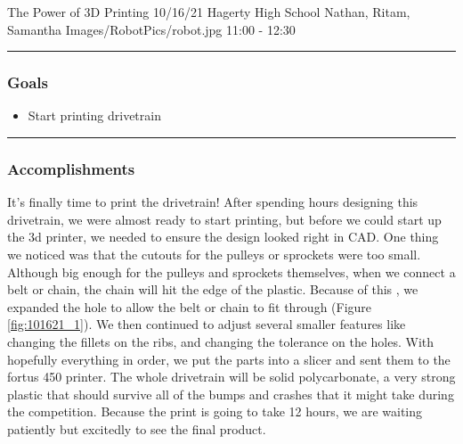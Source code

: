 \insertmeeting 
	{The Power of 3D Printing} 
	{10/16/21}
	{Hagerty High School}
	{Nathan, Ritam, Samantha}
	{Images/RobotPics/robot.jpg}
	{11:00 - 12:30}
	
\noindent\hfil\rule{\textwidth}{.4pt}\hfil
\subsubsection*{Goals}
\begin{itemize}
    \item Start printing drivetrain  

\end{itemize} 

\noindent\hfil\rule{\textwidth}{.4pt}\hfil

\subsubsection*{Accomplishments}
It’s finally time to print the drivetrain! After spending hours designing this drivetrain, we were almost ready to start printing, but before we could start up the 3d printer, we needed to ensure the design looked right in CAD. One thing we noticed was that the cutouts for the pulleys or sprockets were too small. Although big enough for the pulleys and sprockets themselves, when we connect a belt or chain, the chain will hit the edge of the plastic. Because of this , we expanded the hole to allow the belt or chain to fit through (Figure \ref{fig:101621_1}). We then continued to adjust several smaller features like changing the fillets on the ribs, and changing the tolerance on the holes. With hopefully everything in order, we put the parts into a slicer and sent them to the fortus 450 printer. The whole drivetrain will be solid polycarbonate, a very strong plastic that should survive all of the bumps and crashes that it might take during the competition. Because the print is going to take 12 hours, we are waiting patiently but excitedly to see the final product.


